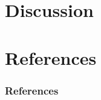 \documentclass{beamer}
\begin{document}
    \section{Discussion}

    \section{References}
   	\begin{frame}[allowframebreaks]
        \frametitle{References}
        
        
    \end{frame}
\end{document}
